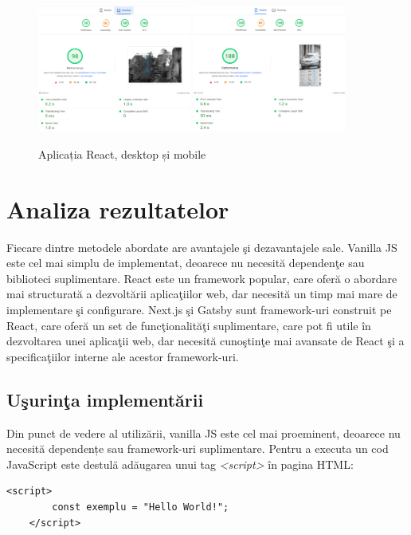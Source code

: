 \documentclass[12pt, a4paper]{report}
\begin{document}
\begin{figure}[htbp]
	\centering
	\includegraphics[width=0.45\textwidth]{02_desktop_pagespeed.png}
	\includegraphics[width=0.45\textwidth]{02_mobile_pagespeed.png}
	\caption{Aplicația React, desktop și mobile}
	\label{fig:02-deployed-pagespeed}
\end{figure}

\section {Analiza rezultatelor}

Fiecare dintre metodele abordate are avantajele \c si dezavantajele sale. Vanilla JS este cel mai simplu de implementat, deoarece nu necesit\u a dependen\c te sau biblioteci suplimentare. React este un framework popular, care ofer\u a o abordare mai structurat\u a a dezvolt\u arii aplica\c tiilor web, dar necesit\u a un timp mai mare de implementare \c si configurare. Next.js \c si Gatsby sunt framework-uri construit pe React, care ofer\u a un set de func\c tionalit\u a\c ti suplimentare, care pot fi utile \^ in dezvoltarea unei aplica\c tii web, dar necesit\u a cuno\c stin\c te mai avansate de React \c si a specifica\c tiilor interne ale acestor framework-uri.


\subsection{U\c surin\c ta implement\u arii}
Din punct de vedere al utiliz\u arii, vanilla JS este cel mai proeminent, deoarece nu necesit\u a dependențe sau framework-uri suplimentare. Pentru a executa un cod JavaScript este destul\u a ad\u augarea unui tag \textit{\textless script\textgreater }   \^ in pagina HTML:
\begin{lstlisting}[caption={Exemplu de ad\u augare a unui script \^ in pagina HTML},captionpos=b]
	<script>
		const exemplu = "Hello World!";
	</script>
	\end{lstlisting}
\end{document}
